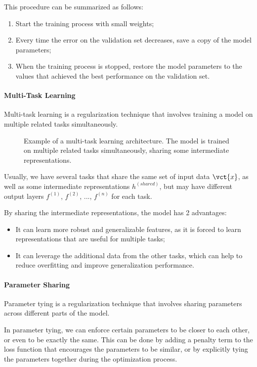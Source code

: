 This procedure can be summarized as follows:
\begin{enumerate}
    \item Start the training process with small weights;
    \item Every time the error on the validation set decreases, save a copy of the model parameters;
    \item When the training process is stopped, restore the model parameters to the values that achieved the best performance on the validation set.
\end{enumerate}

\paragraph{Multi-Task Learning}
Multi-task learning is a regularization technique that involves training a model on multiple related tasks simultaneously.
\begin{figure}[H]
    \centering
    
    \caption{Example of a multi-task learning architecture. 
    The model is trained on multiple related tasks simultaneously, sharing some intermediate representations.}
    \label{fig:multi-task-learning}
\end{figure}

Usually, we have several tasks that share the same set of input data $\vct{x}$, as well as some intermediate representations $h^{(shared)}$,
but may have different output layers $f^{(1)}$, $f^{(2)}$, ..., $f^{(n)}$ for each task.

By sharing the intermediate representations, the model has 2 advantages:
\begin{itemize}
    \item It can learn more robust and generalizable features, as it is forced to learn representations that are useful for multiple tasks;
    \item It can leverage the additional data from the other tasks, which can help to reduce overfitting and improve generalization performance.
\end{itemize}

\paragraph{Parameter Sharing}
Parameter tying is a regularization technique that involves sharing parameters across different parts of the model.

In parameter tying, we can enforce certain parameters to be closer to each other, or even to be exactly the same. 
This can be done by adding a penalty term to the loss function that encourages the parameters to be similar, or by explicitly tying the parameters together during the optimization process.

